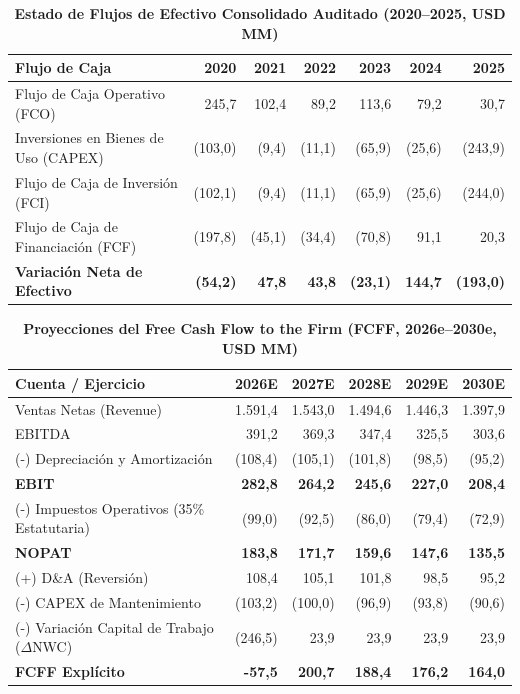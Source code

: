 \documentclass[11pt,a4paper]{article}
\begin{document}
\begin{table}[H]
\centering
\caption{\textbf{Estado de Flujos de Efectivo Consolidado Auditado (2020--2025, USD MM)}}
\scriptsize
\begin{tabularx}{\textwidth}{Xrrrrrr}
\toprule
\textbf{Flujo de Caja} & \textbf{2020} & \textbf{2021} & \textbf{2022} & \textbf{2023} & \textbf{2024} & \textbf{2025} \\
\midrule
Flujo de Caja Operativo (FCO) & 245,7 & 102,4 & 89,2 & 113,6 & 79,2 & 30,7 \\
Inversiones en Bienes de Uso (CAPEX) & (103,0) & (9,4) & (11,1) & (65,9) & (25,6) & (243,9) \\
Flujo de Caja de Inversión (FCI) & (102,1) & (9,4) & (11,1) & (65,9) & (25,6) & (244,0) \\
Flujo de Caja de Financiación (FCF) & (197,8) & (45,1) & (34,4) & (70,8) & 91,1 & 20,3 \\
\textbf{Variación Neta de Efectivo} & \textbf{(54,2)} & \textbf{47,8} & \textbf{43,8} & \textbf{(23,1)} & \textbf{144,7} & \textbf{(193,0)} \\
\bottomrule
\end{tabularx}
\end{table}

\begin{table}[H]
\centering
\caption{\textbf{Proyecciones del Free Cash Flow to the Firm (FCFF, 2026e--2030e, USD MM)}}
\scriptsize
\begin{tabularx}{\textwidth}{Xrrrrr}
\toprule
\textbf{Cuenta / Ejercicio} & \textbf{2026E} & \textbf{2027E} & \textbf{2028E} & \textbf{2029E} & \textbf{2030E} \\
\midrule
Ventas Netas (Revenue) & 1.591,4 & 1.543,0 & 1.494,6 & 1.446,3 & 1.397,9 \\
EBITDA & 391,2 & 369,3 & 347,4 & 325,5 & 303,6 \\
(-) Depreciación y Amortización & (108,4) & (105,1) & (101,8) & (98,5) & (95,2) \\
\textbf{EBIT} & \textbf{282,8} & \textbf{264,2} & \textbf{245,6} & \textbf{227,0} & \textbf{208,4} \\
(-) Impuestos Operativos (35\% Estatutaria) & (99,0) & (92,5) & (86,0) & (79,4) & (72,9) \\
\textbf{NOPAT} & \textbf{183,8} & \textbf{171,7} & \textbf{159,6} & \textbf{147,6} & \textbf{135,5} \\
(+) D\&A (Reversión) & 108,4 & 105,1 & 101,8 & 98,5 & 95,2 \\
(-) CAPEX de Mantenimiento & (103,2) & (100,0) & (96,9) & (93,8) & (90,6) \\
(-) Variación Capital de Trabajo ($\Delta$NWC) & (246,5) & 23,9 & 23,9 & 23,9 & 23,9 \\
\midrule
\textbf{FCFF Explícito} & \textbf{-57,5} & \textbf{200,7} & \textbf{188,4} & \textbf{176,2} & \textbf{164,0} \\
\bottomrule
\end{tabularx}
\end{table}
\end{document}
